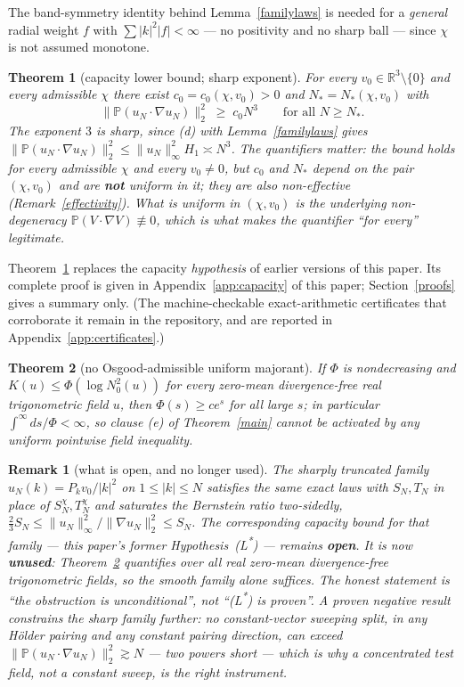 \documentclass[11pt]{article}
\newtheorem{theorem}{Theorem}
\newtheorem{remark}{Remark}
\theoremstyle{definition}
\newcommand{\R}{\mathbb R}
\newcommand{\PP}{\mathbb P}
\begin{document}
The band-symmetry identity behind Lemma~\ref{familylaws} is needed for a
\emph{general} radial weight $f$ with $\sum|k|^2|f|<\infty$ --- no
positivity and no sharp ball --- since $\chi$ is not assumed monotone.

\begin{theorem}[capacity lower bound; sharp exponent]\label{capacity}
For every $v_0\in\R^3\setminus\{0\}$ and every admissible $\chi$ there
exist $c_0=c_0(\chi,v_0)>0$ and $N_*=N_*(\chi,v_0)$ with
\[
\|\PP(u_N\cdot\nabla u_N)\|_2^2\;\ge\;c_0N^3\qquad\text{for all }N\ge N_* .
\]
The exponent $3$ is sharp, since (d) with Lemma~\ref{familylaws} gives
$\|\PP(u_N\cdot\nabla u_N)\|_2^2\le\|u_N\|_\infty^2H_1\asymp N^3$.
The quantifiers matter: the bound holds \emph{for every} admissible
$\chi$ and \emph{every} $v_0\neq0$, but $c_0$ and $N_*$ depend on the
pair $(\chi,v_0)$ and are \textbf{not} uniform in it; they are also
non-effective (Remark~\ref{effectivity}). What \emph{is} uniform in
$(\chi,v_0)$ is the underlying non-degeneracy
$\PP(V\cdot\nabla V)\not\equiv0$, which is what makes the quantifier
``for every'' legitimate.
\end{theorem}

Theorem~\ref{capacity} replaces the capacity \emph{hypothesis} of earlier
versions of this paper. Its complete proof is given in
Appendix~\ref{app:capacity} of this paper; Section~\ref{proofs} gives a
summary only. (The machine-checkable exact-arithmetic certificates that
corroborate it remain in the repository, and are reported in
Appendix~\ref{app:certificates}.)

\begin{theorem}[no Osgood-admissible uniform majorant]\label{nogo}
If $\Phi$ is nondecreasing and
$K(u)\le\Phi(\log N_0^2(u))$ for every zero-mean divergence-free real
trigonometric field $u$, then $\Phi(s)\ge ce^{s}$ for all large $s$;
in particular $\int^\infty ds/\Phi<\infty$, so clause (e) of
Theorem~\ref{main} cannot be activated by any uniform pointwise field
inequality.
\end{theorem}

\begin{remark}[what is open, and no longer used]\label{lstarremark}
The \emph{sharply} truncated family $\hat u_N(k)=P_kv_0/|k|^2$ on
$1\le|k|\le N$ satisfies the same exact laws with $S_N,T_N$ in place of
$S_N^\chi,T_N^\chi$ and saturates the Bernstein ratio two-sidedly,
$\tfrac23S_N\le\|u_N\|_\infty^2/\|\nabla u_N\|_2^2\le S_N$. The
corresponding capacity bound for \emph{that} family --- this paper's
former Hypothesis~(L\textsuperscript{*}) --- remains \textbf{open}. It is
now \textbf{unused}: Theorem~\ref{nogo} quantifies over all real
zero-mean divergence-free trigonometric fields, so the smooth family
alone suffices. The honest statement is ``the obstruction is
unconditional'', not ``(L\textsuperscript{*}) is proven''. A proven
negative result constrains the sharp family further: no constant-vector
sweeping split, in any H\"older pairing and any constant pairing
direction, can exceed $\|\PP(u_N\cdot\nabla u_N)\|_2^2\gtrsim N$ ---
two powers short --- which is why a concentrated test field, not a
constant sweep, is the right instrument.
\end{remark}
\end{document}
